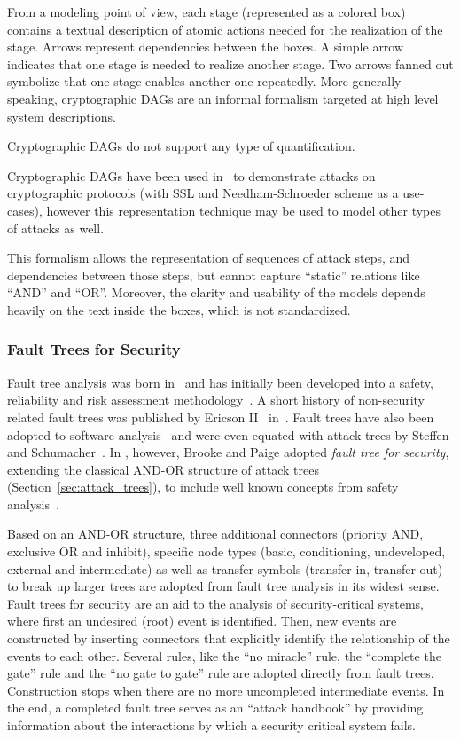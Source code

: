 \documentclass[a4paper]{article}
\begin{document}
From a modeling point of view, each stage (represented as a colored box)
contains a textual description of atomic actions needed for the realization
of the stage. Arrows represent dependencies between the boxes. A simple arrow 
indicates that one stage is needed to realize another stage. Two arrows fanned 
out symbolize that one stage enables another one repeatedly. More generally 
speaking, cryptographic DAGs are an informal formalism targeted at high level 
system descriptions.

Cryptographic DAGs do not support any type of quantification.

Cryptographic DAGs have been used in~\cite{Mead2} to demonstrate attacks on
cryptographic protocols (with SSL and Needham-Schroeder scheme as a use-cases),
however this representation technique may be used to model other types
of attacks as well.

This formalism allows the representation of sequences of attack steps, and
dependencies between those steps, but cannot capture ``static'' relations like
``AND'' and ``OR''. Moreover, the clarity and usability of the models depends
heavily on the text inside the boxes, which is not standardized.

\subsubsection{Fault Trees for Security} 
\label{sec:fault_trees_for_sec}

Fault tree analysis was born in~ and has initially been developed into a
safety, reliability and risk assessment
methodology~\cite{Wats,VeGoRoHa,StVeDuFrMiRa,Elec2}. A short history of
non-security related fault trees was published by Ericson II~\cite{Eric}
in~. Fault trees have also been adopted to software
analysis~\cite{LeHa,Leve,HeWoSlHoMiLu,HeWoSlHoMiWaWaSt} and were even equated
with attack trees by Steffen and Schumacher~\cite{StSc}. In , however,
Brooke and Paige adopted \emph{fault tree for security}, extending the classical
AND-OR structure of attack trees (Section~\ref{sec:attack_trees}), to include
well known concepts from safety analysis~\cite{BrPa}.

Based on an AND-OR structure, three additional connectors (priority AND,
exclusive OR and inhibit), specific node types (basic, conditioning,
undeveloped, external and intermediate) as well as transfer symbols (transfer
in, transfer out) to break up larger trees are adopted from fault tree
analysis in its widest sense. Fault trees for security are an aid to the
analysis of security-critical systems, where first an undesired (root) event is
identified. Then, new events are constructed by inserting connectors that
explicitly identify the relationship of the events to each other. Several
rules, like the ``no miracle'' rule, the ``complete the gate'' rule and the
``no gate to gate'' rule are adopted directly from fault trees. Construction
stops when there are no more uncompleted intermediate events. In the end, a
completed fault tree serves as an ``attack handbook'' by providing information
about the interactions by which a security critical system fails.
\end{document}
